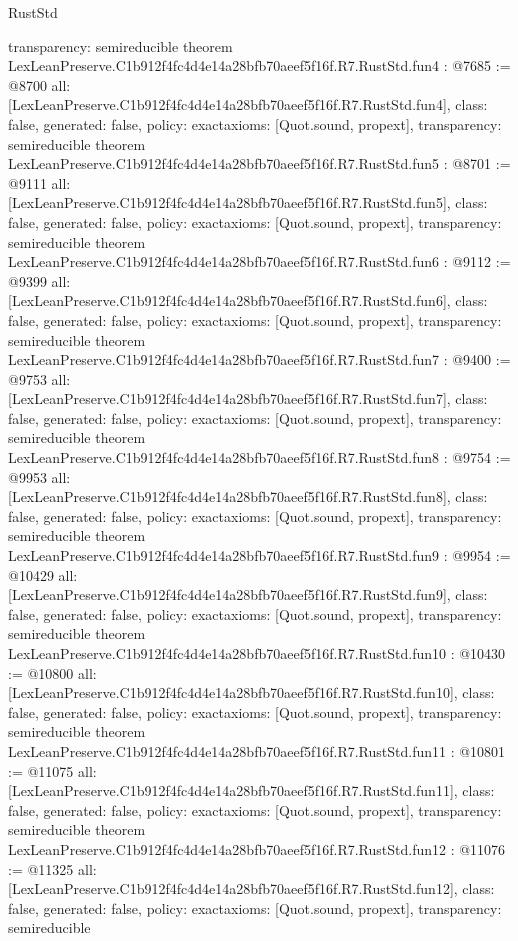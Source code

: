 \begin{lexlean}{RustStd}
\begin{coremodule}
{  transparency: semireducible
}
theorem LexLeanPreserve.C1b912f4fc4d4e14a28bfb70aeef5f16f.R7.RustStd.fun4 : @7685 := @8700 {
  all: [LexLeanPreserve.C1b912f4fc4d4e14a28bfb70aeef5f16f.R7.RustStd.fun4],
  class: false,
  generated: false,
  policy: exact{axioms: [Quot.sound, propext]},
  transparency: semireducible
}
theorem LexLeanPreserve.C1b912f4fc4d4e14a28bfb70aeef5f16f.R7.RustStd.fun5 : @8701 := @9111 {
  all: [LexLeanPreserve.C1b912f4fc4d4e14a28bfb70aeef5f16f.R7.RustStd.fun5],
  class: false,
  generated: false,
  policy: exact{axioms: [Quot.sound, propext]},
  transparency: semireducible
}
theorem LexLeanPreserve.C1b912f4fc4d4e14a28bfb70aeef5f16f.R7.RustStd.fun6 : @9112 := @9399 {
  all: [LexLeanPreserve.C1b912f4fc4d4e14a28bfb70aeef5f16f.R7.RustStd.fun6],
  class: false,
  generated: false,
  policy: exact{axioms: [Quot.sound, propext]},
  transparency: semireducible
}
theorem LexLeanPreserve.C1b912f4fc4d4e14a28bfb70aeef5f16f.R7.RustStd.fun7 : @9400 := @9753 {
  all: [LexLeanPreserve.C1b912f4fc4d4e14a28bfb70aeef5f16f.R7.RustStd.fun7],
  class: false,
  generated: false,
  policy: exact{axioms: [Quot.sound, propext]},
  transparency: semireducible
}
theorem LexLeanPreserve.C1b912f4fc4d4e14a28bfb70aeef5f16f.R7.RustStd.fun8 : @9754 := @9953 {
  all: [LexLeanPreserve.C1b912f4fc4d4e14a28bfb70aeef5f16f.R7.RustStd.fun8],
  class: false,
  generated: false,
  policy: exact{axioms: [Quot.sound, propext]},
  transparency: semireducible
}
theorem LexLeanPreserve.C1b912f4fc4d4e14a28bfb70aeef5f16f.R7.RustStd.fun9 : @9954 := @10429 {
  all: [LexLeanPreserve.C1b912f4fc4d4e14a28bfb70aeef5f16f.R7.RustStd.fun9],
  class: false,
  generated: false,
  policy: exact{axioms: [Quot.sound, propext]},
  transparency: semireducible
}
theorem LexLeanPreserve.C1b912f4fc4d4e14a28bfb70aeef5f16f.R7.RustStd.fun10 : @10430 := @10800 {
  all: [LexLeanPreserve.C1b912f4fc4d4e14a28bfb70aeef5f16f.R7.RustStd.fun10],
  class: false,
  generated: false,
  policy: exact{axioms: [Quot.sound, propext]},
  transparency: semireducible
}
theorem LexLeanPreserve.C1b912f4fc4d4e14a28bfb70aeef5f16f.R7.RustStd.fun11 : @10801 := @11075 {
  all: [LexLeanPreserve.C1b912f4fc4d4e14a28bfb70aeef5f16f.R7.RustStd.fun11],
  class: false,
  generated: false,
  policy: exact{axioms: [Quot.sound, propext]},
  transparency: semireducible
}
theorem LexLeanPreserve.C1b912f4fc4d4e14a28bfb70aeef5f16f.R7.RustStd.fun12 : @11076 := @11325 {
  all: [LexLeanPreserve.C1b912f4fc4d4e14a28bfb70aeef5f16f.R7.RustStd.fun12],
  class: false,
  generated: false,
  policy: exact{axioms: [Quot.sound, propext]},
  transparency: semireducible
}
\end{coremodule}
\end{lexlean}
